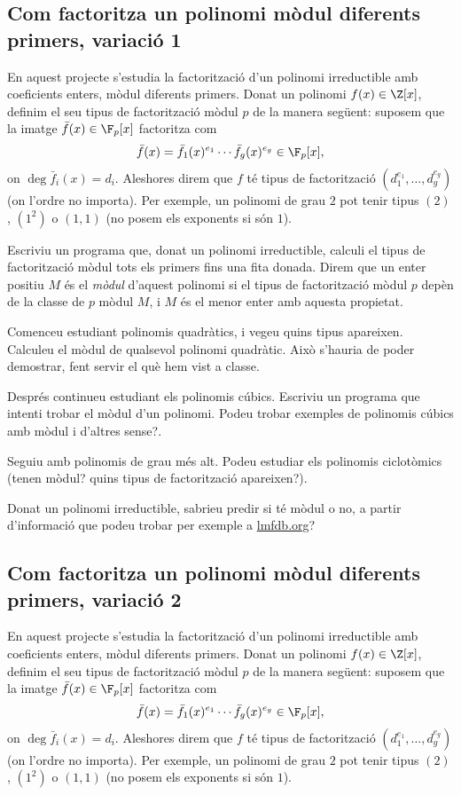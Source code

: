 \subsection{Com factoritza un polinomi mòdul diferents primers, variació 1}
 
 En aquest projecte s'estudia la factorització d'un polinomi irreductible amb coeficients enters, mòdul diferents primers. Donat un polinomi $f(x)\in\Z[x]$, definim el seu tipus de factorització mòdul $p$ de la manera següent: suposem que la imatge $\bar f(x)\in \F_p[x]$ factoritza com
 \[
 \bar f(x)= \bar f_1(x)^{e_1}\cdots \bar f_g(x)^{e_g}\in \F_p[x],
 \]
 on $\deg \bar f_i(x)= d_i$. Aleshores direm que $f$ té tipus de factorització $(d_1^{e_1},\ldots,d_g^{e_g})$ (on l'ordre no importa). Per exemple, un polinomi de grau $2$ pot tenir tipus $(2)$, $(1^2)$ o $(1,1)$ (no posem els exponents si són $1$).
 
 Escriviu un programa que, donat un polinomi irreductible, calculi el tipus de factorització mòdul tots els primers fins una fita donada. Direm que un enter positiu $M$ és el \emph{mòdul} d'aquest polinomi si el tipus de factorització mòdul $p$ depèn de la classe de $p$ mòdul $M$, i $M$ és el menor enter amb aquesta propietat.
 
 Comenceu estudiant polinomis quadràtics, i vegeu quins tipus apareixen. Calculeu el mòdul de qualsevol polinomi quadràtic. Això s'hauria de poder demostrar, fent servir el què hem vist a classe.
 
 Després continueu estudiant els polinomis cúbics. Escriviu un programa que intenti trobar el mòdul d'un polinomi. Podeu trobar exemples de polinomis cúbics amb mòdul i d'altres sense?.
 
 Seguiu amb polinomis de grau més alt. Podeu estudiar els polinomis ciclotòmics (tenen mòdul? quins tipus de factorització apareixen?).
 
 Donat un polinomi irreductible, sabrieu predir si té mòdul o no, a partir d'informació que podeu trobar per exemple a \url{lmfdb.org}?
 
 \subsection{Com factoritza un polinomi mòdul diferents primers, variació 2}
 
 En aquest projecte s'estudia la factorització d'un polinomi irreductible amb coeficients enters, mòdul diferents primers. Donat un polinomi $f(x)\in\Z[x]$, definim el seu tipus de factorització mòdul $p$ de la manera següent: suposem que la imatge $\bar f(x)\in \F_p[x]$ factoritza com
 \[
 \bar f(x)= \bar f_1(x)^{e_1}\cdots \bar f_g(x)^{e_g}\in \F_p[x],
 \]
 on $\deg \bar f_i(x)= d_i$. Aleshores direm que $f$ té tipus de factorització $(d_1^{e_1},\ldots,d_g^{e_g})$ (on l'ordre no importa). Per exemple, un polinomi de grau $2$ pot tenir tipus $(2)$, $(1^2)$ o $(1,1)$ (no posem els exponents si són $1$).
 
